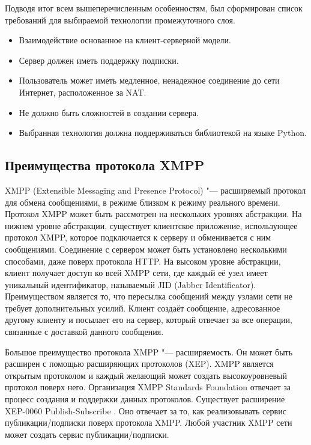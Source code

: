 Подводя итог всем вышеперечисленным особенностям, был сформирован список
требований для выбираемой технологии промежуточного слоя.
\begin{itemize}
\item Взаимодействие основанное на клиент-серверной модели.
\item Сервер должен иметь поддержку подписки.
\item Пользователь может иметь медленное, ненадежное соединение до
сети Интернет, расположенное за NAT.
\item Не должно быть сложностей в создании сервера.
\item Выбранная технология должна поддерживаться библиотекой на языке
Python.
\end{itemize}

\subsection{Преимущества протокола XMPP}


XMPP (Extensible Messaging and Presence Protocol) "--- расширяемый протокол для
обмена сообщениями, в режиме близком к режиму реального времени. Протокол XMPP
может быть рассмотрен на нескольких уровнях абстракции. На нижнем уровне
абстракции, существует клиентское приложение, использующее протокол XMPP,
которое подключается к серверу и обменивается с ним сообщениями. Соединение с
сервером может быть установлено несколькими способами, даже поверх протокола
HTTP. На высоком уровне абстракции, клиент получает доступ ко всей XMPP сети,
где каждый её узел имеет уникальный идентификатор, называемый JID (Jabber
Identificator). Преимуществом является то, что пересылка сообщений между узлами
сети не требует дополнительных усилий. Клиент создаёт сообщение, адресованное
другому клиенту и посылает его на сервер, который отвечает за все операции,
связанные с доставкой данного сообщения.

Большое преимущество протокола XMPP "--- расширяемость. Он может быть расширен с
помощью расширяющих протоколов (XEP). XMPP является открытым протоколом и каждый
желающий может создать высокоуровневый протокол поверх него. Организация XMPP
Standards Foundation отвечает за процесс создания и поддержки данных протоколов.
Существует расширение XEP-0060 Publish-Subscribe \cite{xep-0060}. Оно отвечает
за то, как реализовывать сервис публикации/подписки поверх протокола XMPP. Любой
участник XMPP сети может создать сервис публикации/подписки.

